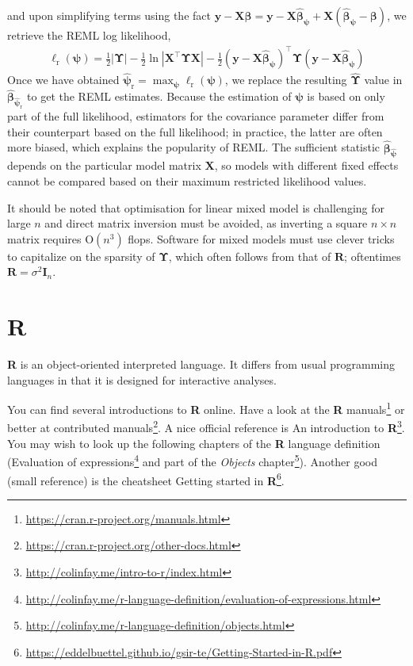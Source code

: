 \documentclass[
  11pt,
  letterpaper,
]{book}
\renewcommand{\href}[2]{#2\footnote{\url{#1}}}
\theoremstyle{definition}
\theoremstyle{definition}
\theoremstyle{definition}
\theoremstyle{definition}
\theoremstyle{remark}
\begin{document}
and upon simplifying terms using the fact \(\boldsymbol{y} - \mathbf{X}\boldsymbol{\beta} = \boldsymbol{y} - \mathbf{X}\widehat{\boldsymbol{\beta}}_{\boldsymbol{\psi}} + \mathbf{X}(\widehat{\boldsymbol{\beta}}_{\boldsymbol{\psi}} - \boldsymbol{\beta})\), we retrieve the REML log likelihood,
\begin{align*}
\ell_{\mathrm{r}}(\boldsymbol{\psi}) = \frac{1}{2}|\boldsymbol{\Upsilon}| - \frac{1}{2} \ln \left|\mathbf{X}^\top\boldsymbol{\Upsilon}\mathbf{X}\right|  - \frac{1}{2}(\boldsymbol{y} -\mathbf{X}\widehat{\boldsymbol{\beta}}_{\boldsymbol{\psi}})^\top \boldsymbol{\Upsilon}(\boldsymbol{y} -\mathbf{X}\widehat{\boldsymbol{\beta}}_{\boldsymbol{\psi}})
\end{align*}
Once we have obtained \(\widehat{\boldsymbol{\psi}}_{\mathrm{r}}= \max_{\boldsymbol{\psi}} \ell_{\mathrm{r}}(\boldsymbol{\psi})\), we replace the resulting \(\widehat{\boldsymbol{\Upsilon}}\) value in
\(\widehat{\boldsymbol{\beta}}_{\widehat{\boldsymbol{\psi}}_{\mathrm{r}}}\)
to get the REML estimates.
Because the estimation of \(\boldsymbol{\psi}\) is based on only part of the full likelihood, estimators for the covariance parameter differ from their counterpart based on the full likelihood; in practice, the latter are often more biased, which explains the popularity of REML. The sufficient statistic \(\widehat{\boldsymbol{\beta}}_{\widehat{\boldsymbol{\psi}}}\) depends on the particular model matrix \(\mathbf{X}\), so models with different fixed effects cannot be compared based on their maximum restricted likelihood values.

It should be noted that optimisation for linear mixed model is challenging for large \(n\) and direct matrix inversion must be avoided, as inverting a square \(n \times n\) matrix requires \(\mathrm{O}(n^3)\) flops. Software for mixed models must use clever tricks to capitalize on the sparsity of \(\boldsymbol{\Upsilon}\), which often follows from that of \(\mathbf{R}\); oftentimes \(\mathbf{R} = \sigma^2 \mathbf{I}_n\).

\hypertarget{r}{%
\chapter{\texorpdfstring{\textbf{R}}{R}}\label{r}}

\textbf{R} is an object-oriented interpreted language. It differs from usual programming languages in that it is designed for interactive analyses.

You can find several introductions to \textbf{R} online. Have a look at the \href{https://cran.r-project.org/manuals.html}{\textbf{R} manuals} or better at \href{https://cran.r-project.org/other-docs.html}{contributed manuals}. A nice official reference is \href{http://colinfay.me/intro-to-r/index.html}{An introduction to \textbf{R}}.
You may wish to look up the following chapters of the \textbf{R} language definition (\href{http://colinfay.me/r-language-definition/evaluation-of-expressions.html}{Evaluation of expressions} and part of the \href{http://colinfay.me/r-language-definition/objects.html}{\emph{Objects} chapter}). Another good (small reference) is the cheatsheet \href{https://eddelbuettel.github.io/gsir-te/Getting-Started-in-R.pdf}{Getting started in \textbf{R}}.
\end{document}
